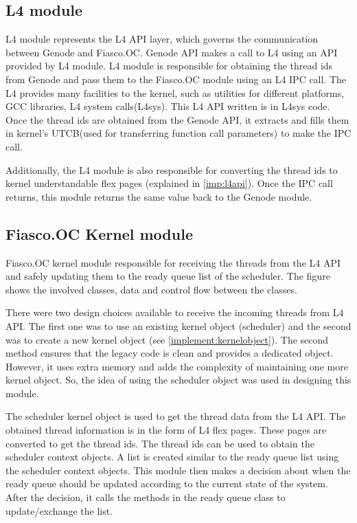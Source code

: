 \subsection{L4 module}

L4 module represents the L4 API layer, which governs the communication between Genode and Fiasco.OC. Genode API makes a call to L4 using an API provided by L4 module. L4 module is responsible for obtaining the thread ids from Genode and pass them to the Fiasco.OC module using an L4 IPC call. The L4 provides many facilities to the kernel, such as utilities for different platforms, GCC  libraries, L4 system calls(L4sys). This L4 API written is in L4sys code. Once the thread ids are obtained from the Genode API, it extracts and fills them in kernel's UTCB(used for transferring function call parameters) to make the IPC call.

Additionally, the L4 module is also responsible for converting the thread ids to kernel understandable flex pages (explained in \ref{imp:l4api}). Once the IPC call returns, this module returns the same value back to the Genode module. 

\subsection{Fiasco.OC Kernel module}

Fiasco.OC kernel module responsible for receiving the threads from the L4 API and safely updating them to the ready queue list of the scheduler. The figure %
shows the involved classes, data and control flow between the classes.

There were two design choices available to receive the incoming threads from L4 API. The first one was to use an existing kernel object (scheduler) and the second was to create a new kernel object (see \ref{implement:kernelobject}). The second method ensures that the legacy code is clean and provides a dedicated object. However, it uses extra memory and adds the complexity of maintaining one more kernel object. So, the idea of using the scheduler object was used in designing this module. 

The scheduler kernel object is used to get the thread data from the L4 API. The obtained thread information is in the form of L4 flex pages. These pages are converted to get the thread ids. The thread ids can be used to obtain the scheduler context objects. A list is created similar to the ready queue list using the scheduler context objects. This module then makes a decision about when the ready queue should be updated according to the current state of the system. After the decision, it calls the methods in the ready queue class to update/exchange the list.

